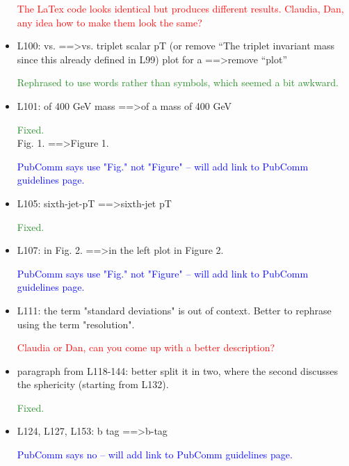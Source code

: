 \documentclass[paper=a4, fontsize=11pt]{scrartcl}
\begin{document}
\begin{itemize}
\textcolor{Red}{The LaTex code looks identical but produces different results. Claudia, Dan, any idea how to make them look the same?}\\

\item L100: 
vs. ==\textgreater vs. triplet scalar pT (or remove “The triplet invariant mass since 
this already defined in L99) 
plot for a ==\textgreater remove “plot” 

\textcolor{ForestGreen}{Rephrased to use words rather than symbols, which seemed a bit awkward.}\\


\item L101: 
of 400 GeV mass ==\textgreater of a mass of 400 GeV 

\textcolor{ForestGreen}{Fixed.}\\

Fig. 1. ==\textgreater Figure 1. 

\textcolor{Blue}{PubComm says use "Fig." not "Figure" -- will add link to PubComm guidelines page.}\\

\item L105: 
sixth-jet-pT ==\textgreater sixth-jet pT 

\textcolor{ForestGreen}{Fixed.}\\

\item L107: 
in Fig. 2. ==\textgreater in the left plot in Figure 2. 

\textcolor{Blue}{PubComm says use "Fig." not "Figure" -- will add link to PubComm guidelines page.}\\


\item L111: 
the term "standard deviations" is out of context. Better to rephrase using 
the term "resolution". 

\textcolor{Red}{Claudia or Dan, can you come up with a better description?}\\

\item paragraph from L118-144: 
better split it in two, where the second discusses the sphericity (starting 
from L132). 

\textcolor{ForestGreen}{Fixed.}\\

\item L124, L127, L153: 
b tag ==\textgreater b-tag 

\textcolor{Blue}{PubComm says no -- will add link to PubComm guidelines page.}\\


\end{itemize}
\end{document}
